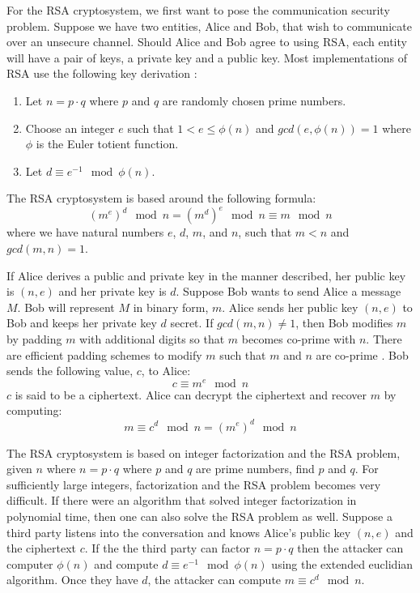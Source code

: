 \documentclass[10pt]{CSUNthesis}
\theoremstyle{plain}%
\theoremstyle{definition}
\theoremstyle{remark}
\newcommand{\lr}[1]{\left( #1 \right)}
\begin{document}
For the RSA cryptosystem, we first want to pose the communication security problem.  
Suppose we have two entities, Alice and Bob, that wish to communicate over an unsecure channel.
Should Alice and Bob agree to using RSA, each entity will have a pair of keys, a private key and a public key.
Most implementations of RSA use the following key derivation \cite{rivest1978method}:
\begin{enumerate}
\item Let $n=p\cdot q$ where $p$ and $q$ are randomly chosen prime numbers.
\item Choose an integer $e$ such that $1 < e \leq \phi (n)$ and $gcd\lr{e,\phi\lr{n}}=1$ where $\phi$ is the Euler totient function.
\item Let $d \equiv e^{-1} \mod \phi(n)$.
\end{enumerate}
The RSA cryptosystem is based around the following formula:
$$\left(m^e\right)^d \mod n= \left(m^d\right)^e \mod n\equiv m \mod n$$
where we have natural numbers $e$, $d$, $m$, and $n$, such that $m < n$ and $gcd(m,n)=1$.


If Alice derives a public and private key in the manner described, her public key is $(n,e)$ and her private key is $d$.
Suppose Bob wants to send Alice a message $M$.  
Bob will represent $M$ in binary form, $m$.
Alice sends her public key $(n,e)$ to Bob and keeps her private key $d$ secret.  
If $gcd(m,n)\neq 1$, then Bob modifies $m$ by padding $m$ with additional digits so that $m$ becomes co-prime with $n$.
There are efficient padding schemes to modify $m$ such that $m$ and $n$ are co-prime \cite{jonsson2003public}.
Bob sends the following value, $c$, to Alice:
$$c \equiv m^e \mod n$$
$c$ is said to be a ciphertext.
Alice can decrypt the ciphertext and recover $m$ by computing:
$$ m \equiv c^d \mod n = \lr{m^e}^d \mod n$$

The RSA cryptosystem is based on integer factorization and the RSA problem, given $n$ where $n=p\cdot q$ where $p$ and $q$ are prime numbers, find $p$ and $q$.
For sufficiently large integers, factorization and the RSA problem becomes very difficult.  
If there were an algorithm that solved integer factorization in polynomial time, then one can also solve the RSA problem as well.
Suppose a third party listens into the conversation and knows Alice's public key $(n,e)$ and the ciphertext $c$.
If the the third party can factor $n = p\cdot q$ then the attacker can computer $\phi(n)$ and compute $d \equiv e^{-1} \mod \phi(n)$ using the extended euclidian algorithm.
Once they have $d$, the attacker can compute $m \equiv c^d \mod n$.
\end{document}
